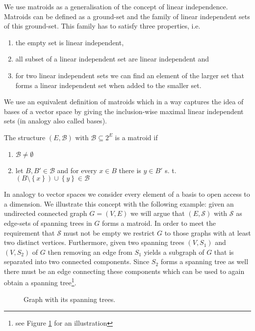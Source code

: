 \documentclass{scrartcl}
\theoremstyle{nonumberplain}
\newcommand{\tupel}[1]{\left(#1\right)}
\newcommand{\set}[1]{\left\{#1\right\}}
\begin{document}
We use matroids as a generalisation of the concept of linear independence.
Matroids can be defined as a ground-set and the family of linear
independent sets of this ground-set. This family has to satisfy three
properties, i.e.
\begin{enumerate}
  \item the empty set is linear independent,
  \item all subset of a linear independent set are linear independent and
  \item for two linear independent sets we can find an element of the larger
    set that forms a linear independent set when added to the smaller set.
\end{enumerate}
We use an equivalent definition of matroids which in a way captures the idea of
bases of a vector space by giving the inclusion-wise maximal linear independent
sets (in analogy also called bases).
\begin{defi}
  The structure $\tupel{E, \mathcal{B}}$ with $\mathcal{B}\subseteq 2^{E}$ is
  a matroid if
  \begin{enumerate}
    \item $\mathcal{B}\neq\emptyset$
    \item let $B,B'\in\mathcal{B}$ and for every $x\in B$ there is $y\in B'$
      s. t. $(B\setminus\set{x})\cup\set{y}\in\mathcal{B}$
  \end{enumerate}
\end{defi}
In analogy to vector spaces we consider every element of a basis to open access
to a dimension. We illustrate this concept with the following example: given an
undirected connected graph $G = \tupel{V, E}$ we will argue that
$\tupel{E, \mathcal{S}}$ with $\mathcal{S}$ as edge-sets of spanning trees
in $G$ forms a matroid. In order to meet the requirement that $\mathcal{S}$
must not be empty we restrict $G$ to those graphs with at least two distinct
vertices. Furthermore, given two spanning trees $\tupel{V, S_{1}}$ and
$\tupel{V, S_{2}}$ of $G$ then removing an edge from $S_{1}$ yields a subgraph
of $G$ that is separated into two connected components. Since $S_{2}$ forms a
spanning tree as well there must be an edge connecting these components which
can be used to again obtain a spanning tree\footnote{see Figure
\ref{fig:spanning} for an illustration}.
\begin{figure}
  \begin{center}
  \end{center}
  \caption{Graph with its spanning trees.}
  \label{fig:spanning}
\end{figure}
\end{document}
